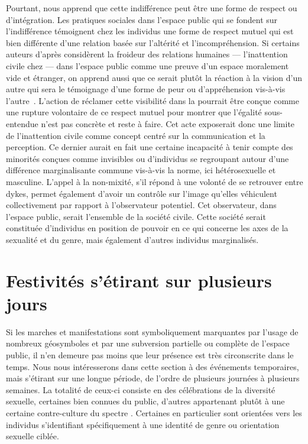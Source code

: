 Pourtant, \citeauthor{Frosh2006} nous apprend que cette indifférence peut être une forme de respect ou d'intégration. 
Les pratiques sociales dans l'espace public qui se fondent sur l'indifférence témoignent chez les individus une forme de respect mutuel qui est bien différente d'une relation basée sur l'altérité et l'incompréhension. 
Si certains auteurs d'après \citeauthor{Frosh2006} considèrent la froideur des relations humaines --- l'inattention civile chez \citeauthor{Goffman1956} --- dans l'espace public comme une preuve d'un espace moralement vide et étranger, on apprend aussi que ce serait plutôt la réaction à la vision d'un autre qui sera le témoignage d'une forme de peur ou d'appréhension vis-à-vis l'autre~\citep[279--280]{Frosh2006}. 
L'action de réclamer cette visibilité dans la \dm{} pourrait être conçue comme une rupture volontaire de ce respect mutuel pour montrer que l'égalité sous-entendue n'est pas concrète et reste à faire. 
Cet acte exposerait donc une limite de l'inattention civile comme concept centré sur la communication et la perception. 
Ce dernier aurait en fait une certaine incapacité à tenir compte des minorités conçues comme invisibles ou d'individus se regroupant autour d'une différence marginalisante commune vis-à-vis la norme, ici hétérosexuelle et masculine. 
L'appel à la non-mixité, s'il répond à une volonté de se retrouver entre dykes, permet également d'avoir un contrôle sur l'image qu'elles véhiculent collectivement par rapport à l'observateur potentiel.
Cet observateur, dans l'espace public, serait l'ensemble de la société civile. 
Cette société serait constituée d'individus en position de pouvoir en ce qui concerne les axes de la sexualité et du genre, mais également d'autres individus marginalisés.

\section{Festivités s'étirant sur plusieurs jours}
\label{sec:festivitesplusieursjours}
Si les marches et manifestations sont symboliquement marquantes par l'usage de nombreux géosymboles et par une subversion partielle ou complète de l'espace public, il n’en demeure pas moins que leur présence est très circonscrite dans le temps.
Nous nous intéresserons dans cette section à des événements temporaires, mais s'étirant sur une longue période, de l'ordre de plusieurs journées à plusieurs semaines.
La totalité de ceux-ci consiste en des célébrations de la diversité sexuelle, certaines bien connues du public, d'autres appartenant plutôt à une certaine contre-culture du spectre \lgbt. 
Certaines en particulier sont orientées vers les individus s'identifiant spécifiquement à une identité de genre ou orientation sexuelle ciblée.

